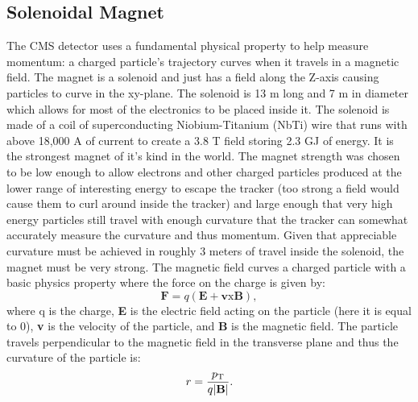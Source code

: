 	\subsection{Solenoidal Magnet}
	\label{sec:solenoidal_magnet}
The CMS detector uses a fundamental physical property to help measure momentum: a charged particle's trajectory curves when it travels in a magnetic field. The magnet is a solenoid and just has a field along the Z-axis causing particles to curve in the xy-plane. The solenoid is 13 m long and 7 m in diameter which allows for most of the electronics to be placed inside it. The solenoid is made of a coil of superconducting Niobium-Titanium (NbTi) wire that runs with above 18,000 A of current to create a 3.8 T field storing 2.3 GJ of energy. It is the strongest magnet of it's kind in the world. The magnet strength was chosen to be low enough to allow electrons and other charged particles produced at the lower range of interesting energy to escape the tracker (too strong a field would cause them to curl around inside the tracker) and large enough that very high energy particles still travel with enough curvature that the tracker can somewhat accurately measure the curvature and thus momentum. Given that appreciable curvature must be achieved in roughly 3 meters of travel inside the solenoid, the magnet must be very strong. The magnetic field curves a charged particle with a basic physics property where the force on the charge is given by:
\begin{equation}
\mathrm{\textbf{F}}=q(\mathrm{\textbf{E}}+\mathrm{\textbf{v}}\mathrm{x}\mathrm{\textbf{B}}),
\end{equation}		
where q is the charge, \textbf{E} is the electric field acting on the particle (here it is equal to 0), \textbf{v} is the velocity of the particle, and \textbf{B} is the magnetic field. The particle travels perpendicular to the magnetic field in the transverse plane and thus the curvature of the particle is:
\begin{equation}
r = \frac{p_{\mathrm{T}}}{q |\mathrm{\textbf{B}}|}.
\end{equation}		
		
		

